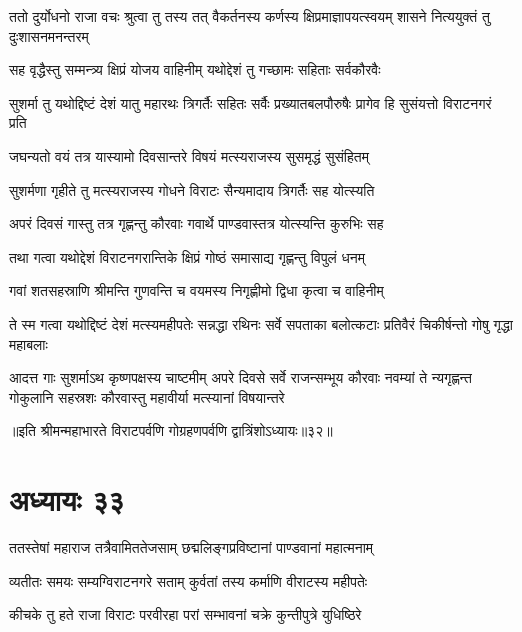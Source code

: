 
\threelineshloka
{ततो दुर्योधनो राजा वचः श्रुत्वा तु तस्य तत्}
{वैकर्तनस्य कर्णस्य क्षिप्रमाज्ञापयत्स्वयम्}
{शासने नित्ययुक्तं तु दुःशासनमनन्तरम्}




\twolineshloka
{सह वृद्धैस्तु सम्मन्त्र्य क्षिप्रं योजय वाहिनीम्}
{यथोद्देशं तु गच्छामः सहिताः सर्वकौरवैः}


\threelineshloka
{सुशर्मा तु यथोद्दिष्टं देशं यातु महारथः}
{त्रिगर्तैः सहितः सर्वैः प्रख्यातबलपौरुषैः}
{प्रागेव हि सुसंयत्तो विराटनगरं प्रति}


\twolineshloka
{जघन्यतो वयं तत्र यास्यामो दिवसान्तरे}
{विषयं मत्स्यराजस्य सुसमृद्धं सुसंहितम्}


\twolineshloka
{सुशर्मणा गृहीते तु मत्स्यराजस्य गोधने}
{विराटः सैन्यमादाय त्रिगर्तैः सह योत्स्यति}


\twolineshloka
{अपरं दिवसं गास्तु तत्र गृह्णन्तु कौरवाः}
{गवार्थे पाण्डवास्तत्र योत्स्यन्ति कुरुभिः सह}


\twolineshloka
{तथा गत्वा यथोद्देशं विराटनगरान्तिके}
{क्षिप्रं गोष्ठं समासाद्य गृह्णन्तु विपुलं धनम्}


\twolineshloka
{गवां शतसहस्राणि श्रीमन्ति गुणवन्ति च}
{वयमस्य निगृह्णीमो द्विधा कृत्वा च वाहिनीम्}



\threelineshloka
{ते स्म गत्वा यथोद्दिष्टं देशं मत्स्यमहीपतेः}
{सन्नद्धा रथिनः सर्वे सपताका बलोत्कटाः}
{प्रतिवैरं चिकीर्षन्तो गोषु गृद्धा महाबलाः}


\onelineshloka
{आदत्त गाः सुशर्माऽथ कृष्णपक्षस्य चाष्टमीम्}
\threelineshloka
{अपरे दिवसे सर्वे राजन्सम्भूय कौरवाः}
{नवम्यां ते न्यगृह्णन्त गोकुलानि सहस्रशः}
{कौरवास्तु महावीर्या मत्स्यानां विषयान्तरे}

॥इति श्रीमन्महाभारते विराटपर्वणि गोग्रहणपर्वणि द्वात्रिंशोऽध्यायः॥३२॥

\chapter{अध्यायः ३३}

\twolineshloka
{ततस्तेषां महाराज तत्रैवामिततेजसाम्}
{छद्मलिङ्गप्रविष्टानां पाण्डवानां महात्मनाम्}


\twolineshloka
{व्यतीतः समयः सम्यग्विराटनगरे सताम्}
{कुर्वतां तस्य कर्माणि वीराटस्य महीपतेः}


\twolineshloka
{कीचके तु हते राजा विराटः परवीरहा}
{परां सम्भावनां चक्रे कुन्तीपुत्रे युधिष्ठिरे}



